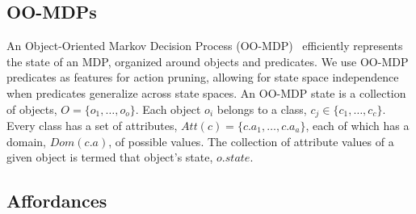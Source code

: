 \documentclass[conference]{IEEEtran}
\begin{document}
\subsection{OO-MDPs}

An Object-Oriented Markov Decision Process (OO-MDP)~\citep{diuk08}
efficiently represents the state of an MDP, organized around objects
and predicates. We use OO-MDP predicates as features for action
pruning, allowing for state space independence when predicates
generalize across state spaces.  An OO-MDP state is a collection of
objects, $O = \{o_1, \ldots, o_o \}$.  Each object $o_i$ belongs to a
class, $c_j \in \{c_1, \ldots, c_c\}$. Every class has a set of
attributes, $Att(c) = \{c.a_1, \ldots, c.a_a \}$, each of which has a
domain, $Dom(c.a)$, of possible values. The collection of attribute
values of a given object is termed that object's state, $o.state$. 




\subsection{Affordances}

\end{document}
